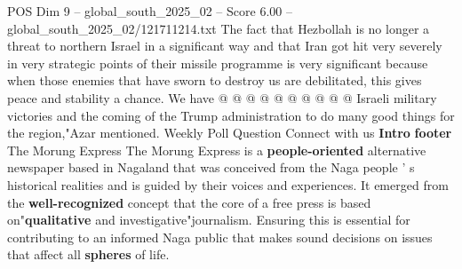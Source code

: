 \begin{textsample}{POS Dim 9 – global\_south\_2025\_02 – Score 6.00 – global\_south\_2025\_02/121711214.txt}
The fact that Hezbollah is no longer a threat to northern Israel in a significant way and that Iran got hit very severely in very strategic points of their missile programme is very significant because when those enemies that have sworn to destroy us are debilitated, this gives peace and stability a chance.
We have @ @ @ @ @ @ @ @ @ @ Israeli military victories and the coming of the Trump administration to do many good things for the region,"Azar mentioned.
Weekly Poll Question Connect with us \textbf{Intro} \textbf{footer} The Morung Express The Morung Express is a \textbf{people-oriented} alternative newspaper based in Nagaland that was conceived from the Naga people ' s historical realities and is guided by their voices and experiences.
It emerged from the \textbf{well-recognized} concept that the core of a free press is based on"\textbf{qualitative} and investigative"journalism.
Ensuring this is essential for contributing to an informed Naga public that makes sound decisions on issues that affect all \textbf{spheres} of life.

\end{textsample}
